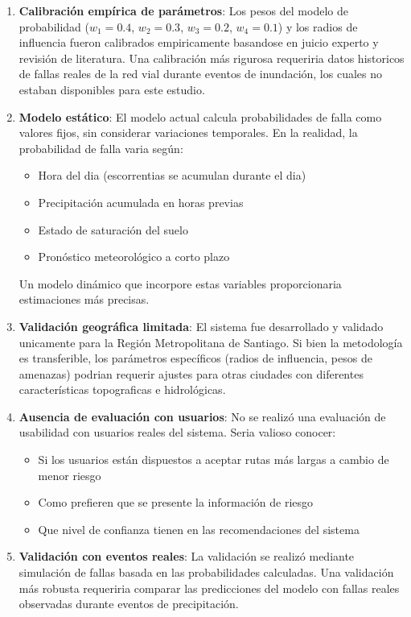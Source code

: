 \documentclass[conference]{IEEEtran}
\begin{document}
\begin{enumerate}
    \item \textbf{Calibración empírica de parámetros}: Los pesos del modelo de probabilidad ($w_1=0.4$, $w_2=0.3$, $w_3=0.2$, $w_4=0.1$) y los radios de influencia fueron calibrados empiricamente basandose en juicio experto y revisión de literatura. Una calibración más rigurosa requeriria datos historicos de fallas reales de la red vial durante eventos de inundación, los cuales no estaban disponibles para este estudio.

    \item \textbf{Modelo estático}: El modelo actual calcula probabilidades de falla como valores fijos, sin considerar variaciones temporales. En la realidad, la probabilidad de falla varia según:
    \begin{itemize}
        \item Hora del dia (escorrentias se acumulan durante el dia)
        \item Precipitación acumulada en horas previas
        \item Estado de saturación del suelo
        \item Pronóstico meteorológico a corto plazo
    \end{itemize}
    Un modelo dinámico que incorpore estas variables proporcionaria estimaciones más precisas.

    \item \textbf{Validación geográfica limitada}: El sistema fue desarrollado y validado unicamente para la Región Metropolitana de Santiago. Si bien la metodología es transferible, los parámetros específicos (radios de influencia, pesos de amenazas) podrian requerir ajustes para otras ciudades con diferentes características topograficas e hidrológicas.

    \item \textbf{Ausencia de evaluación con usuarios}: No se realizó una evaluación de usabilidad con usuarios reales del sistema. Seria valioso conocer:
    \begin{itemize}
        \item Si los usuarios están dispuestos a aceptar rutas más largas a cambio de menor riesgo
        \item Como prefieren que se presente la información de riesgo
        \item Que nivel de confianza tienen en las recomendaciones del sistema
    \end{itemize}

    \item \textbf{Validación con eventos reales}: La validación se realizó mediante simulación de fallas basada en las probabilidades calculadas. Una validación más robusta requeriria comparar las predicciones del modelo con fallas reales observadas durante eventos de precipitación.


\end{enumerate}
\end{document}
